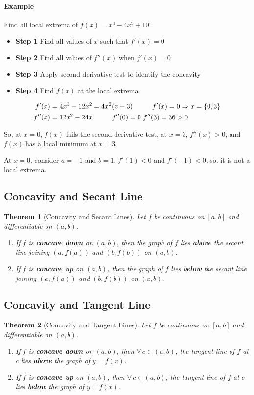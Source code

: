 \documentclass[12pt]{article}
\newcommand\tab[1][1cm]{\hspace*{#1}}
\newtheorem{theorem}{Theorem}
\begin{document}
\paragraph{Example} Find all local extrema of $f(x) = x^4 - 4x^3 + 10$!
\begin{itemize} 
    \item \textbf{Step 1} Find all values of $x$ such that $f'(x) = 0$
    \item \textbf{Step 2} Find all values of $f''(x)$ when $f'(x) = 0$
    \item \textbf{Step 3} Apply second derivative test to identify the concavity
    \item \textbf{Step 4} Find $f(x)$ at the local extrema
\end{itemize}
\begin{align*} 
    f'(x) &= 4x^3 - 12x^2 = 4x^2(x - 3) \textrm{\tab} f'(x) = 0 \Rightarrow x = \{0, 3\} \\
    f''(x) &= 12x^2 - 24x \textrm{\tab} f''(0) = 0 \textrm{   } f''(3) = 36 > 0
\end{align*}

So, at $x = 0$, $f(x)$ fails the second derivative test, at $x = 3$, $f''(x) > 0$, and 
$f(x)$ has a local minimum at $x = 3$.  

At $x = 0$, consider $a = -1$ and $b = 1$. $f'(1) < 0$ and $f'(-1) < 0$, so, it is not a local extrema.
\subsection{Concavity and Secant Line}
\begin{theorem}[Concavity and Secant Lines]
    Let $f$ be continuous on $[a, b]$ and differentiable on $(a, b)$.
    \begin{enumerate} 
        \item If $f$ is \textbf{concave down} on $(a, b)$, then the graph of $f$ lies \textbf{above} the secant line joining $(a, f(a))$ and $(b, f(b))$ on $(a, b)$.
        \item  If $f$ is \textbf{concave up} on $(a, b)$, then the graph of $f$ lies \textbf{below} the secant line joining $(a, f(a))$ and $(b, f(b))$ on $(a, b)$.
    \end{enumerate}
\end{theorem}

\subsection{Concavity and Tangent Line}
\begin{theorem}[Concavity and Tangent Lines]
    Let $f$ be continuous on $[a, b]$ and differentiable on $(a, b)$.
    \begin{enumerate} 
        \item If $f$ is \textbf{concave down} on $(a, b)$, then $\forall \, c \in (a, b)$, the tangent line of $f$ at $c$ lies \textbf{above} the graph of $y = f(x)$.
        \item  If $f$ is \textbf{concave up} on $(a, b)$, then $\forall \, c \in (a, b)$, the tangent line of $f$ at $c$ lies \textbf{below} the graph of $y = f(x)$.
    \end{enumerate}
\end{theorem}
\end{document}

